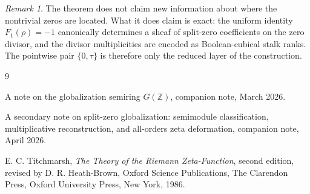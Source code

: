 \documentclass[11pt,a4paper]{article}
\theoremstyle{definition}
\theoremstyle{remark}
\newtheorem{remark}[theorem]{Remark}
\newcommand{\ZZ}{\mathbb Z}
\begin{document}
\begin{remark}
The theorem does not claim new information about where the nontrivial zeros are located. What it does claim is exact: the uniform identity \(F_1(\rho)=-1\) canonically determines a sheaf of split-zero coefficients on the zero divisor, and the divisor multiplicities are encoded as Boolean-cubical stalk ranks. The pointwise pair \(\{0,\tau\}\) is therefore only the reduced layer of the construction.
\end{remark}

\begin{thebibliography}{9}

A note on the globalization semiring \(G(\ZZ)\), companion note, March 2026.

A secondary note on split-zero globalization: semimodule classification, multiplicative reconstruction, and all-orders zeta deformation, companion note, April 2026.

E. C. Titchmarsh, \emph{The Theory of the Riemann Zeta-Function}, second edition, revised by D. R. Heath-Brown, Oxford Science Publications, The Clarendon Press, Oxford University Press, New York, 1986.

\end{thebibliography}
\end{document}
